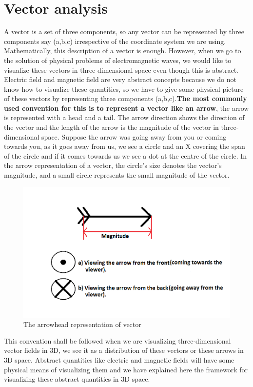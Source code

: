 \section{Vector analysis}

A vector is a set of three components, so any vector can be represented by three components say (a,b,c) irrespective of the coordinate system we are using. Mathematically, this description of a vector is enough. However, when we go to the solution of physical problems of electromagnetic waves, we would like to visualize these vectors in three-dimensional space even though this is abstract. Electric field and magnetic field are very abstract concepts because we do not know how to visualize these quantities, so we have to give some physical picture of these vectors by representing three components (a,b,c).\textbf{The most commonly used convention for this is to represent a vector like an arrow}, the arrow is represented with a head and a tail. The arrow direction shows the direction of the vector and the length of the arrow is the magnitude of the vector in three-dimensional space. Suppose the arrow was going away from you or coming towards you, as it goes away from us, we see a circle and an \textgravedbl X \textacutedbl covering the span of the circle and if it comes towards us we see a dot at the centre of the circle. In the arrow representation of a vector, the circle's size denotes the vector's magnitude, and a small circle represents the small magnitude of the vector.
\begin{figure}[h]
\centering
\includegraphics[width=1\linewidth]{./graphics/arrowhead}
\caption{The arrowhead representation of vector}
\end{figure}

This convention shall be followed when we are visualizing three-dimensional vector fields in 3D, we see it as a distribution of these vectors or these arrows in 3D space. Abstract quantities like electric and magnetic fields will have some physical means of visualizing them and we have explained here the framework for visualizing these abstract quantities in 3D space.  

